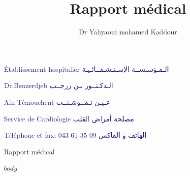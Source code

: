 \documentclass[12pt,a4paper]{article}
\author{Dr Yahyaoui mohamed Kaddour}
\title{Rapport médical }
\begin{document}
 \textcolor{MidnightBlue}{Établissement hospitalier \hfill \textarabic{الـمـؤسـســة الإسـتـشـفــائـيـة}}
 
 \textcolor{MidnightBlue}{Dr.Benzerdjeb \hfill \textarabic{الـدكـتــور بـن زرجــب}}
 
 
 
\textcolor{MidnightBlue}{ Ain Témouchent \hfill \textarabic{عـيـن تـمــوشـنــت}}
 
\textcolor{MidnightBlue}{Service de Cardiologie \hfill \textarabic{مصلحة أمراض القلب}}
 
 \textcolor{MidnightBlue}{Téléphone et fax:  043 61 35 09 \hfill \textarabic{الهاتف و الفاكس}}

\begin{center} \huge{ Rapport médical}
	

\end{center}


$body$

\fancyfoot[R]{\today}
\end{document}
